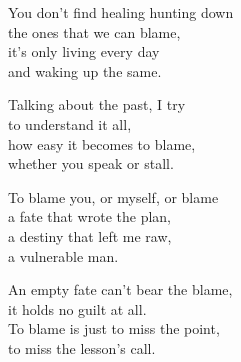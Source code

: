 \begin{lyrics}
You don't find healing hunting down\\
the ones that we can blame,\\
it's only living every day\\
and waking up the same.

Talking about the past, I try\\
to understand it all,\\
how easy it becomes to blame,\\
whether you speak or stall.

To blame you, or myself, or blame\\
a fate that wrote the plan,\\
a destiny that left me raw,\\
a vulnerable man.

An empty fate can't bear the blame,\\
it holds no guilt at all.\\
To blame is just to miss the point,\\
to miss the lesson's call.
\end{lyrics}

